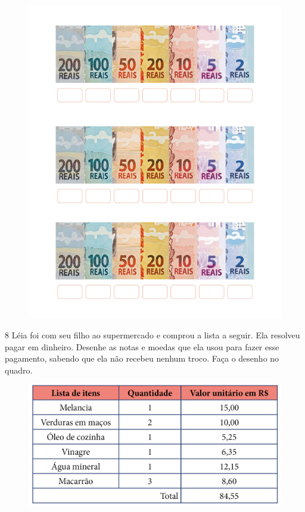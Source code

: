 \begin{figure}[htpb!]
\includegraphics[width=.9\textwidth]{./media/image70.png}
\end{figure}



\pagebreak

\num{8} Léia foi com seu filho ao supermercado e comprou a lista a seguir. Ela
resolveu pagar em dinheiro. Desenhe as notas e moedas que ela usou para
fazer esse pagamento, sabendo que ela não recebeu nenhum troco. Faça o
desenho no quadro.


\begin{figure}[htpb!]
\includegraphics[width=\textwidth]{./media/image75.png}
\end{figure}

